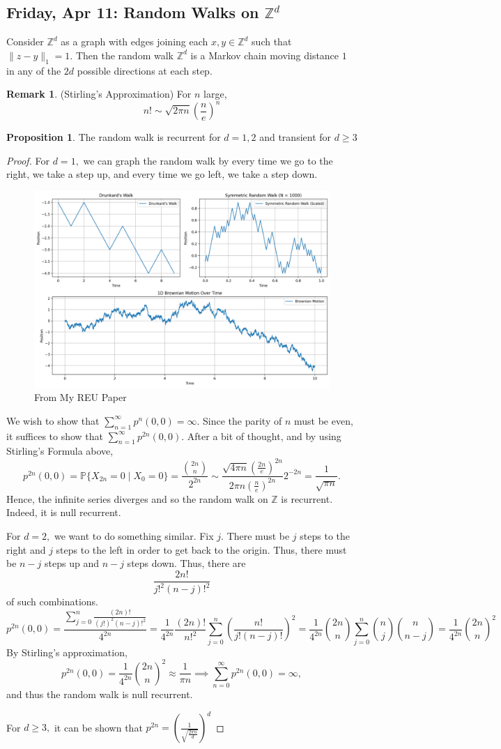 \documentclass[10pt, oneside]{article}
\newcommand{\bbZ}{\mathbb{Z}}
\newcommand{\bbP}{\mathbb{P}}
\theoremstyle{definition}
\newtheorem{prop}{Proposition}
\newtheorem{rem}{Remark}
\begin{document}
\subsection{Friday, Apr 11: Random Walks on $\bbZ^d$}
Consider $\bbZ^d$ as a graph with edges joining each $x,y \in \bbZ^d$ such that $\|z-y\|_1 = 1.$ Then the random walk $\bbZ^d$ is a Markov chain moving distance $1$ in any of the $2d$ possible directions at each step.
\begin{rem}
    (Stirling's Approximation) For $n$ large, 
    \[n! \sim \sqrt{2\pi n}(\frac{n}{e})^n\]
\end{rem}
\begin{prop}
    The random walk is recurrent for $d = 1,2$ and transient for $d\geq 3$
\end{prop}
\begin{proof}
    For $d = 1,$ we can graph the random walk by every time we go to the right, we take a step up, and every time we go left, we take a step down. 
\begin{figure}[H]
    \centering
    \includegraphics[width=0.5\linewidth]{Images/Drunkard's Walk.png}
    \caption{From My REU Paper}
\end{figure}
We wish to show that $\sum_{n=1}^\infty p^n(0,0) = \infty.$ Since the parity of $n$ must be even, it suffices to show that $\sum_{n=1}^\infty p^{2n}(0,0).$ After a bit of thought, and by using Stirling's Formula above,
\[p^{2n}(0,0) = \bbP\{X_{2n} = 0 \mid X_0 = 0\} = \frac{\binom{2n}{n}}{2^{2n}} \sim \frac{\sqrt{4\pi n}(\frac{2n}{e})^{2n}}{2\pi n (\frac{n}{e})^{2n}}2^{-2n} = \frac{1}{\sqrt{\pi n}}.\] Hence, the infinite series diverges and so the random walk on $\bbZ$ is recurrent. Indeed, it is null recurrent. 

For $d = 2,$ we want to do something similar. Fix $j.$ There must be $j$ steps to the right and $j$ steps to the left in order to get back to the origin. Thus, there must be $n-j$ steps up and $n-j$ steps down. Thus, there are 
\[\frac{2n!}{j!^2(n-j)!^2}\] of such combinations.
\[p^{2n}(0,0) = \frac{\sum_{j=0}^{n}\frac{(2n)!}{(j!)^2 (n-j)!^2}}{4^{2n}} = \frac{1}{4^{2n}}\frac{(2n)!}{n!^2}\sum_{j=0}^n \left(\frac{n!}{j! (n-j)!}\right)^2 = \frac{1}{4^{2n}}\binom{2n}{n}\sum_{j=0}^n \binom{n }{j}\binom{n}{n-j} = \frac{1}{4^{2n}} \binom{2n}{n}^2\] By Stirling's approximation,
\[p^{2n}(0,0)   = \frac{1}{4^{2n}} \binom{2n}{n}^2\approx \frac{1}{\pi n} \implies \sum_{n=0}^\infty p^{2n}(0,0) = \infty,\] and thus the random walk is null recurrent.


For $d\geq 3,$ it can be shown that $p^{2n} = \left(\frac{1}{\sqrt{\frac{2\pi n}{d}}}\right)^d$

\end{proof}
\end{document}
